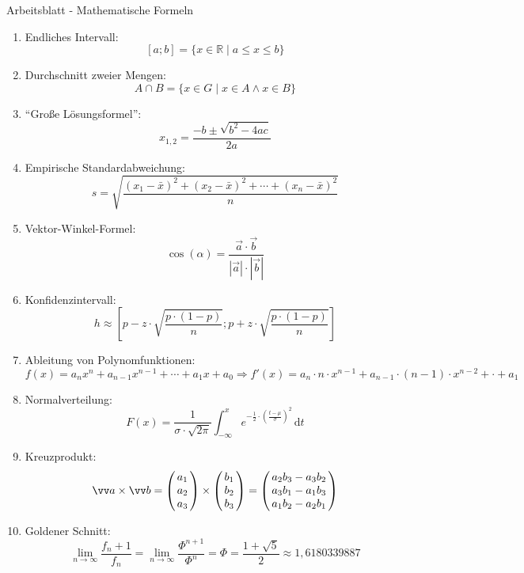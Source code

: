 \documentclass[a4paper,12pt]{report}
\begin{document}
\begin{center}
\begin{large}
Arbeitsblatt - Mathematische Formeln
\end{large}
\end{center}
\begin{enumerate}
\item Endliches Intervall:\\
$$[a;b]=\{x\in\mathbb{R}\mid a\leq x\leq b\}$$

\item Durchschnitt zweier Mengen:\\
$$A\cap B=\{x\in G\mid x\in A\wedge x\in B\}$$

\item "`Große Lösungsformel"':\\
$$x_{1,2}=\dfrac{-b\pm\sqrt{b^2-4ac}}{2a}$$

\item Empirische Standardabweichung:
$$s=\sqrt{\dfrac{(x_1-\bar{x})^2+(x_2-\bar{x})^2+\cdots+(x_n-\bar{x})^2}{n}}$$

\item Vektor-Winkel-Formel:
$$\cos(\alpha)=\dfrac{\vec{a}\cdot\vec{b}}{|\vec{a}|\cdot|\vec{b}|}$$

\item Konfidenzintervall:
$$h\approx\left[p-z\cdot\sqrt{\dfrac{p\cdot(1-p)}{n}};p+z\cdot\sqrt{\dfrac{p\cdot(1-p)}{n}}\right]$$

\item Ableitung von Polynomfunktionen:\\
$$f(x)=a_nx^n+a_{n-1}x^{n-1}+\cdots+a_1x+a_0 \Rightarrow f'(x)=a_n\cdot n\cdot x^{n-1}+a_{n-1}\cdot(n-1)\cdot x^{n-2}+\cdot+a_1$$

\item Normalverteilung:
$$F(x)=\dfrac{1}{\sigma\cdot\sqrt{2\pi}}\displaystyle\int^x_{-\infty}e^{-\frac{1}{2}\cdot\left(\frac{t-\mu}{\sigma}\right)^2}\,\text{d}t$$

\item Kreuzprodukt:
$$\vec{a}\times\vec{b}=\Vek{a_1}{a_2}{a_3}\times\Vek{b_1}{b_2}{b_3}=\Vek{a_2b_3-a_3b_2}{a_3b_1-a_1b_3}{a_1b_2-a_2b_1}$$

\item Goldener Schnitt:
$$\lim\limits_{n\rightarrow\infty}\dfrac{f_n+1}{f_n}=\lim\limits_{n\rightarrow\infty}\dfrac{\Phi^{n+1}}{\Phi^n}=\Phi=\dfrac{1+\sqrt{5}}{2}\approx 1,6180339887$$
\end{enumerate}

\end{document}

